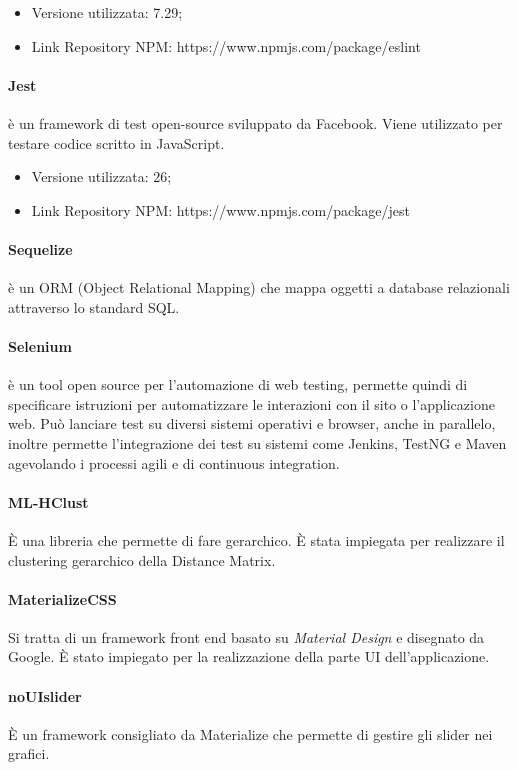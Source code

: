 \documentclass[../manuale_sviluppatore.tex]{subfiles}
\begin{document}
\begin{itemize}
    \item Versione utilizzata: 7.29;
    \item Link Repository NPM: https://www.npmjs.com/package/eslint 
\end{itemize}

\paragraph{Jest}
 è un framework di test open-source sviluppato da Facebook. Viene utilizzato per testare codice scritto in JavaScript. 
\begin{itemize}
    \item Versione utilizzata: 26;
    \item Link Repository NPM: https://www.npmjs.com/package/jest 
\end{itemize}

\paragraph{Sequelize}
 è un ORM (Object Relational Mapping) che mappa oggetti a database relazionali attraverso lo standard SQL.

\paragraph{Selenium}
 è un tool open source per l'automazione di web testing, permette quindi di specificare istruzioni per automatizzare le interazioni con il sito o l’applicazione web. 
Può lanciare test su diversi sistemi operativi e browser, anche in parallelo, inoltre permette l’integrazione dei test su sistemi come Jenkins, TestNG e Maven agevolando i processi agili e di continuous integration.

\paragraph{ML-HClust}
È una libreria che permette di fare  gerarchico. È stata impiegata per realizzare il clustering gerarchico della Distance Matrix.

\paragraph{MaterializeCSS}
Si tratta di un framework front end basato su \emph{Material Design} e disegnato da Google. È stato impiegato per la realizzazione della parte UI dell'applicazione.


\paragraph{noUIslider}
È un framework consigliato da Materialize che permette di gestire gli slider nei grafici. 
\end{document}
